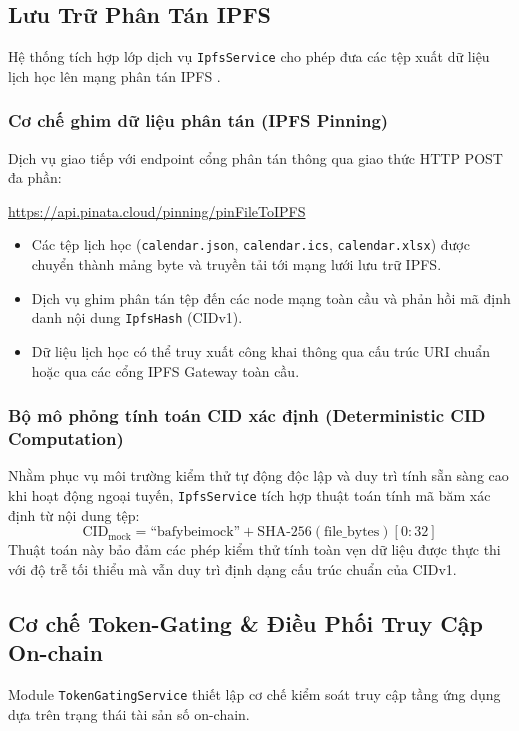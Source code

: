 \documentclass[11pt,a4paper]{article}
\begin{document}
\subsection{Lưu Trữ Phân Tán IPFS}
Hệ thống tích hợp lớp dịch vụ \texttt{IpfsService} cho phép đưa các tệp xuất dữ liệu lịch học lên mạng phân tán IPFS \cite{benet2014ipfs}.

\subsubsection{Cơ chế ghim dữ liệu phân tán (IPFS Pinning)}
Dịch vụ giao tiếp với endpoint cổng phân tán thông qua giao thức HTTP POST đa phần:
\begin{center}
\footnotesize\url{https://api.pinata.cloud/pinning/pinFileToIPFS}
\end{center}
\begin{itemize}
    \item Các tệp lịch học (\texttt{calendar.json}, \texttt{calendar.ics}, \texttt{calendar.xlsx}) được chuyển thành mảng byte và truyền tải tới mạng lưới lưu trữ IPFS.
    \item Dịch vụ ghim phân tán tệp đến các node mạng toàn cầu và phản hồi mã định danh nội dung \texttt{IpfsHash} (CIDv1).
    \item Dữ liệu lịch học có thể truy xuất công khai thông qua cấu trúc URI chuẩn  hoặc qua các cổng IPFS Gateway toàn cầu.
\end{itemize}

\subsubsection{Bộ mô phỏng tính toán CID xác định (Deterministic CID Computation)}
Nhằm phục vụ môi trường kiểm thử tự động độc lập và duy trì tính sẵn sàng cao khi hoạt động ngoại tuyến, \texttt{IpfsService} tích hợp thuật toán tính mã băm xác định từ nội dung tệp:
\begin{equation}
\text{CID}_{\text{mock}} = \text{``bafybeimock''} + \text{SHA-256}(\text{file\_bytes})[0:32]
\end{equation}
Thuật toán này bảo đảm các phép kiểm thử tính toàn vẹn dữ liệu được thực thi với độ trễ tối thiểu mà vẫn duy trì định dạng cấu trúc chuẩn của CIDv1.

\subsection{Cơ chế Token-Gating \& Điều Phối Truy Cập On-chain}
Module \texttt{TokenGatingService} thiết lập cơ chế kiểm soát truy cập tầng ứng dụng dựa trên trạng thái tài sản số on-chain.
\end{document}
